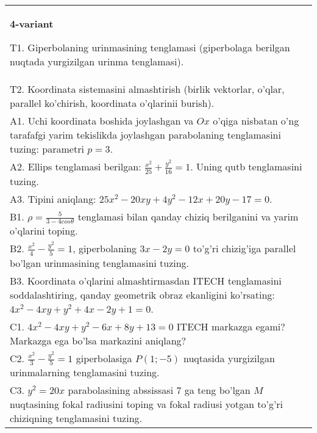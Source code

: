 \documentclass{article}
\begin{document}
\begin{tabular}{m{17cm}}
\textbf{4-variant}
\newline

T1. Giperbolaning urinmasining tenglamasi (giperbolaga berilgan nuqtada yurgizilgan urinma tenglamasi).\\

T2. Koordinata sistemasini almashtirish (birlik vektorlar, o'qlar, parallel ko'chirish, koordinata o'qlarinii burish).\\

A1. Uchi koordinata boshida joylashgan va $Ox$ o'qiga nisbatan o'ng tarafafgi yarim tekislikda joylashgan parabolaning tenglamasini tuzing: parametri $p=3$.\\

A2. Ellips tenglamasi berilgan: $\frac{x^2}{25}+\frac{y^2}{16}=1$. Uning qutb tenglamasini tuzing.\\

A3. Tipini aniqlang: $25x^{2}-20xy+4y^{2}-12x+20y-17=0$.\\

B1. $\rho = \frac{5}{3 - 4cos\theta}$ tenglamasi bilan qanday chiziq berilganini va yarim o'qlarini toping.  \\

B2. $\frac{x^{2}}{4} - \frac{y^{2}}{5} = 1$, giperbolaning $3x - 2y = 0$ to'g'ri chizig'iga parallel bo'lgan urinmasining tenglamasini tuzing.  \\

B3. Koordinata o'qlarini almashtirmasdan ITECH tenglamasini soddalashtiring, qanday geometrik obraz ekanligini ko'rsating: $4x^{2} - 4xy + y^{2} + 4x - 2y + 1 = 0$.  \\

C1. $4x^{2} - 4xy + y^{2} - 6x + 8y + 13 = 0$ ITECH markazga egami? Markazga ega bo'lsa markazini aniqlang?  \\

C2. $\frac{x^{2}}{3} - \frac{y^{2}}{5} = 1$ giperbolasiga $P(1; - 5)$ nuqtasida yurgizilgan urinmalarning tenglamasini tuzing.\\

C3. $y^{2} = 20x$ parabolasining abssissasi 7 ga teng bo'lgan $M$ nuqtasining fokal radiusini toping va fokal radiusi yotgan to'g'ri chiziqning tenglamasini tuzing.  \\

\end{tabular}
\vspace{1cm}
\end{document}
